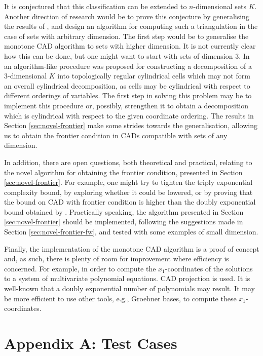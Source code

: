 \documentclass[
]{book}
\theoremstyle{definition}
\theoremstyle{definition}
\theoremstyle{definition}
\theoremstyle{definition}
\theoremstyle{remark}
\begin{document}
It is conjectured that this classification can be extended to \(n\)-dimensional sets \(K\).
Another direction of research would be to prove this conjecture by generalising the results of \citet{bgv15}, and design an algorithm for computing such a triangulation in the case of sets with arbitrary dimension.
The first step would be to generalise the monotone CAD algorithm to sets with higher dimension.
It is not currently clear how this can be done, but one might want to start with sets of dimension \(3\).
In \citet{bgvII} an algorithm-like procedure was proposed for constructing a decomposition of a 3-dimensional \(K\)
into topologically regular cylindrical cells which may not form an overall cylindrical decomposition, as cells may be cylindrical with respect to different orderings of variables.
The first step in solving this problem may be to implement this procedure or, possibly, strengthen it to obtain a decomposition which is cylindrical with respect to the given coordinate ordering.
The results in Section \ref{sec:novel-frontier} make some strides towards the generalisation, allowing us to obtain the frontier condition in CADs compatible with sets of any dimension.

In addition, there are open questions, both theoretical and practical, relating to the novel algorithm for obtaining the frontier condition, presented in Section \ref{sec:novel-frontier}. For example, one might try to tighten the triply exponential complexity bound, by exploring whether it could be lowered, or by proving that the bound on CAD with frontier condition is higher than the doubly exponential bound obtained by \citet{davenportHeintz1988}. Practically speaking, the algorithm presented in Section \ref{sec:novel-frontier} should be implemented, following the suggestions made in Section \ref{sec:novel-frontier-fw}, and tested with some examples of small dimension.

Finally, the implementation of the monotone CAD algorithm is a proof of concept and, as such, there is plenty of room for improvement where efficiency is concerned. For example, in order to compute the \(x_1\)-coordinates of the solutions to a system of multivariate polynomial equations. CAD projection is used. It is well-known that a doubly exponential number of polynomials may result. It may be more efficient to use other tools, e.g., Groebner bases, to compute these \(x_1\)-coordinates.

\hypertarget{appendix-a-test-cases}{%
\chapter*{Appendix A: Test Cases}\label{appendix-a-test-cases}}
\end{document}
